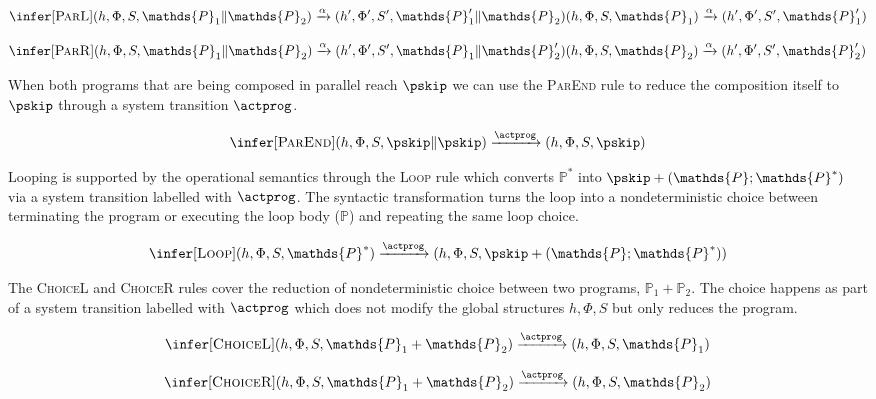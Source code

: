 \[
\infer[\textsc{ParL}]
{
	 (h, \Phi, S, \mathds{P}_1 \| \mathds{P}_2)
	\xrightarrow{\alpha}
	(h', \Phi', S', \mathds{P}_1' \| \mathds{P}_2)
}
{
	 (h, \Phi, S, \mathds{P}_1)
	\xrightarrow{\alpha}
	(h', \Phi', S', \mathds{P}_1')
}
\]

\[
\infer[\textsc{ParR}]
{
	 (h, \Phi, S, \mathds{P}_1 \| \mathds{P}_2)
	\xrightarrow{\alpha}
	(h', \Phi', S', \mathds{P}_1 \| \mathds{P}_2')
}
{
	 (h, \Phi, S, \mathds{P}_2)
	\xrightarrow{\alpha}
	(h', \Phi', S', \mathds{P}_2')
}
\]

When both programs that are being composed in parallel reach $\pskip$ we can use the \textsc{ParEnd} rule to reduce the composition itself to $\pskip$ through a system transition $\actprog$.

\[
\infer[\textsc{ParEnd}]
{
	 (h, \Phi, S, \pskip \| \pskip)
	\xrightarrow{\actprog}
	(h, \Phi, S, \pskip)
}
{}
\]

Looping is supported by the operational semantics through the \textsc{Loop} rule which converts $\mathds{P}^*$ into $\pskip + (\mathds{P} ; \mathds{P}^*)$ via a system transition labelled with $\actprog$. The syntactic transformation turns the loop into a nondeterministic choice between terminating the program or executing the loop body ($\mathds{P}$) and repeating the same loop choice.

\[
\infer[\textsc{Loop}]
{
	 (h, \Phi, S, \mathds{P}^*)
	\xrightarrow{\actprog}
	(h, \Phi, S, \pskip + (\mathds{P} ; \mathds{P}^*))
}
{}
\]

The \textsc{ChoiceL} and \textsc{ChoiceR} rules cover the reduction of nondeterministic choice between two programs, $\mathds{P}_1 + \mathds{P}_2$. The choice happens as part of a system transition labelled with $\actprog$ which does not modify the global structures $h, \Phi, S$ but only reduces the program.

\[
\infer[\textsc{ChoiceL}]
{
	 (h, \Phi, S, \mathds{P}_1 + \mathds{P}_2)
	\xrightarrow{\actprog}
	(h, \Phi, S, \mathds{P}_1)
}
{}
\]

\[
\infer[\textsc{ChoiceR}]
{
	 (h, \Phi, S, \mathds{P}_1 + \mathds{P}_2)
	\xrightarrow{\actprog}
	(h, \Phi, S, \mathds{P}_2)
}
{}
\]